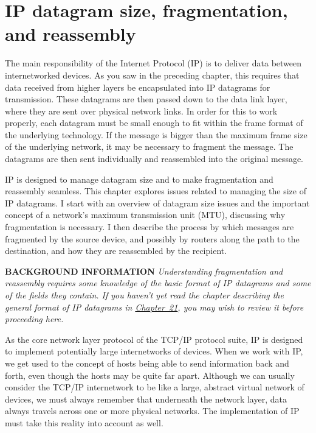 \chapter{IP datagram size, fragmentation, and reassembly}
\label{chap:kozierok-ch22}


The main responsibility of the Internet Protocol (IP) is to deliver data
between internetworked devices. As you saw in the preceding chapter,
this requires that data received from higher layers be encapsulated into
IP datagrams for transmission. These datagrams are then passed down to
the data link layer, where they are sent over physical network links. In
order for this to work properly, each datagram must be small enough to
fit within the frame format of the underlying technology. If the message
is bigger than the maximum frame size of the underlying network, it may
be necessary to fragment the message. The datagrams are then sent
individually and reassembled into the original message.

IP is designed to manage datagram size and to make fragmentation and
reassembly seamless. This chapter explores issues related to managing
the size of IP datagrams. I start with an overview of datagram size
issues and the important concept of a network's maximum transmission
unit (MTU), discussing why fragmentation is necessary. I then describe
the process by which messages are fragmented by the source device, and
possibly by routers along the path to the destination, and how they are
reassembled by the recipient.


{\textbf{BACKGROUND INFORMATION}} {\emph{Understanding fragmentation and
reassembly requires some knowledge of the basic format of IP datagrams
and some of the fields they contain. If you haven't yet read the chapter
describing the general format of IP datagrams in
\protect\hyperlink{ch21.html}{Chapter~21}, you may wish to review it
before proceeding here.}}

\protect\hypertarget{ch22.htmlux5cux23idx-CHP-22-0793}{}{}As the core
network layer protocol of the TCP/IP protocol suite, IP is designed to
implement potentially large internetworks of devices. When we work with
IP, we get used to the concept of hosts being able to send information
back and forth, even though the hosts may be quite far apart. Although
we can usually consider the TCP/IP internetwork to be like a large,
abstract virtual network of devices, we must always remember that
underneath the network layer, data always travels across one or more
physical networks. The implementation of IP must take this reality into
account as well.


